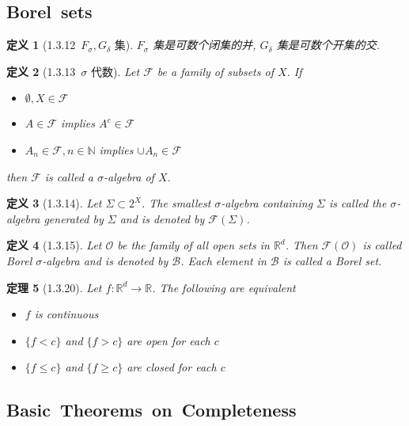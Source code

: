 \documentclass[10pt,openany]{book}
\theoremstyle{thmstyle} %
\newtheorem{theorem}{定理}[chapter]
\theoremstyle{defstyle} %
\newtheorem{definition}[theorem]{定义}
\theoremstyle{prostyle} %
\begin{document}
\subsection{Borel~sets}

\begin{definition}[1.3.12~$F_\sigma, G_\delta$ 集]
$F_\sigma$ 集是可数个闭集的并, $G_\delta$ 集是可数个开集的交.
\end{definition}

\begin{definition}[1.3.13~$\sigma$ 代数]
Let $\mathcal{F}$ be a family of subsets of $X$. If
\begin{itemize}
  \item $\emptyset, X \in \mathcal{F}$
  \item $A \in \mathcal{F}$ implies $A^c \in \mathcal{F}$
  \item $A_n \in \mathcal{F}, n \in \mathbb{N}$ implies $\cup A_n \in \mathcal{F}$
\end{itemize}
then $\mathcal{F}$ is called a $\sigma$-algebra of $X$.
\end{definition}

\begin{definition}[1.3.14]
Let $\Sigma \subset 2^X$. The smallest $\sigma$-algebra containing $\Sigma$ is called the $\sigma$-algebra generated by $\Sigma$ and is denoted by $\mathcal{F}(\Sigma)$.
\end{definition}

\begin{definition}[1.3.15]
Let $\mathcal{O}$ be the family of all open sets in $\mathbb{R}^d$. Then $\mathcal{F}(\mathcal{O})$ is called Borel $\sigma$-algebra and is denoted by $\mathcal{B}$. Each element in $\mathcal{B}$ is called a Borel set.
\end{definition}


\begin{theorem}[1.3.20]
Let $f: \mathbb{R}^d \rightarrow \mathbb{R}$. The following are equivalent
\begin{itemize}
  \item $f$ is continuous
  \item $\{f<c\}$ and $\{f>c\}$ are open for each $c$
  \item $\{f \leq c\}$ and $\{f \geq c\}$ are closed for each $c$
\end{itemize}
\end{theorem}


\subsection{Basic~Theorems~on~Completeness}
\end{document}
